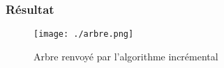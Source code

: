 \documentclass[a4paper,10pt]{article}
\begin{document}
\subsubsection*{Résultat}

\begin{figure}[h]
 \begin{center}
  \texttt{[image: ./arbre.png]}
 \end{center}
 \caption{Arbre renvoyé par l'algorithme incrémental}
\end{figure}


\medskip




\appendix %
\end{document}
